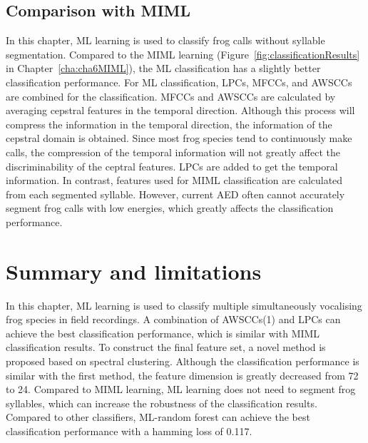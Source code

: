 \begin{table}[htb!]
\centering
\caption{Comparison of different ML classifiers}
\label{tab:MLclassifierComparision}
\end{table}




\subsection{Comparison with MIML}
In this chapter, ML learning is used to classify frog calls without syllable segmentation. Compared to the MIML learning (Figure~\ref{fig:classificationResults} in Chapter~\ref{cha:cha6MIML}), the ML classification has a slightly better classification performance. For ML classification, LPCs, MFCCs, and AWSCCs are combined for the classification. MFCCs and AWSCCs are calculated by averaging cepstral features in the temporal direction. Although this process will compress the information in the temporal direction, the information of the cepstral domain is obtained. Since most frog species tend to continuously make calls, the compression of the temporal information will not greatly affect the discriminability of the ceptral features.
LPCs are added to get the temporal information. In contrast, features used for MIML classification are calculated from each segmented syllable. However, current AED often cannot accurately segment frog calls with low energies, which greatly affects the classification performance.


\section{Summary and limitations}
In this chapter, ML learning is used to classify multiple simultaneously vocalising frog species in field recordings. A combination of AWSCCs(1) and LPCs can achieve the best classification performance, which is similar with MIML classification results. To construct the final feature set, a novel method is proposed based on spectral clustering. Although the classification performance is similar with the first method, the feature dimension is greatly decreased from 72 to 24. Compared to MIML learning, ML learning does not need to segment frog syllables, which can increase the robustness of the classification results. Compared to other classifiers, ML-random forest can achieve the best classification performance with a hamming loss of 0.117. 





